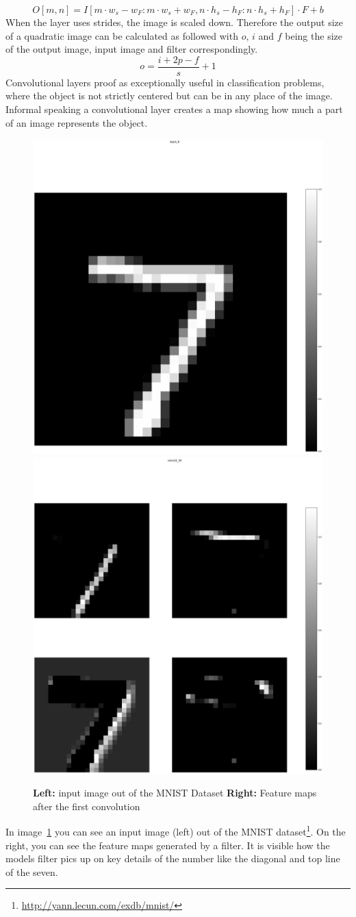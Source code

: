 \documentclass{article}
\begin{document}
\begin{equation}
    \label{eq:conv_2d}
    O[m,n] = I[m\cdot w_s-w_F:m\cdot w_s+w_F, n\cdot h_s-h_F:n\cdot h_s+h_F] \cdot F + b
\end{equation}
When the layer uses strides, the image is scaled down. Therefore the output size of a quadratic image can be calculated as followed with $o$, $i$ and $f$ being the size of the output image, input image and filter correspondingly.
\begin{equation}
    o = \frac{i+2p-f}{s}+1
\end{equation}
Convolutional layers proof as exceptionally useful in classification problems, where the object is not strictly centered but can be in any place of the image. Informal speaking a convolutional layer creates a map showing how much a part of an image represents the object.
\begin{figure}[!ht]
    \centering
    \includegraphics[width=.5\linewidth]{images/0_input_8.png}\hfill
    \includegraphics[width=.5\linewidth]{images/1_conv2d_38.png}\hfill
    \caption[Convolutional layer example]{\textbf{Left:} input image out of the MNIST Dataset \textbf{Right:} Feature maps after the first convolution}
    \label{fig:conv_feature_map}
\end{figure}
In image~\ref{fig:conv_feature_map} you can see an input image (left) out of the MNIST dataset\footnote{\url{http://yann.lecun.com/exdb/mnist/}}. On the right, you can see the feature maps generated by a filter. It is visible how the models filter pics up on key details of the number like the diagonal and top line of the seven. 
\end{document}

